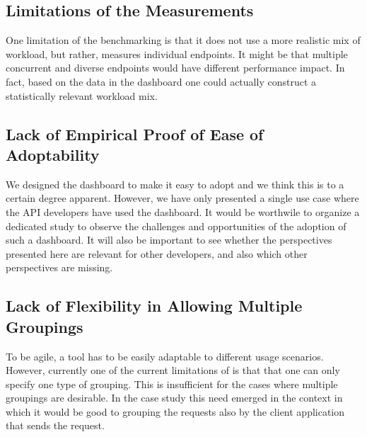   \subsection*{Limitations of the Measurements}
    One limitation of the benchmarking is that it does not use a more realistic mix of workload, but rather, measures individual endpoints. It might be that multiple concurrent and diverse endpoints would have different performance impact. In fact, based on the data in the dashboard one could actually construct a statistically relevant workload mix. 


  \subsection*{Lack of Empirical Proof of Ease of Adoptability}

    We designed the dashboard to make it easy to adopt and we think this is to a certain degree apparent. However, we have only presented a single use case where the API developers have used the dashboard. It would be worthwile to organize a dedicated study to observe the challenges and opportunities of the adoption of such a dashboard. It will also be important to see whether the perspectives presented here are relevant for other developers, and also which other perspectives are missing.





  \subsection*{Lack of Flexibility in Allowing Multiple Groupings}

    To be agile, a tool has to be easily adaptable to different usage scenarios. However, currently one of the current limitations of \tool is that that one can only specify one type of grouping. This is insufficient for the cases where multiple groupings are desirable. In the \zee case study this need emerged in the context in which it would be good to grouping the requests also by the client application that sends the request.


